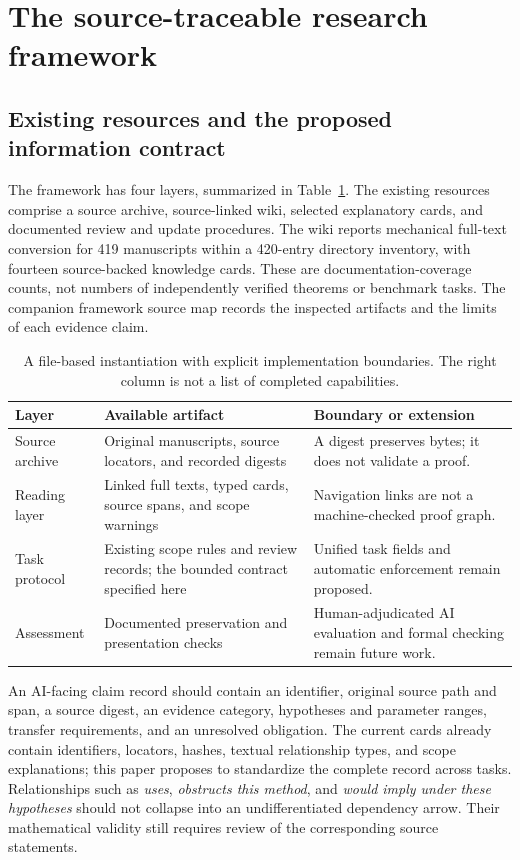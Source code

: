 \section{The source-traceable research framework}\label{sec:framework}
\subsection{Existing resources and the proposed information contract}
The framework has four layers, summarized in Table~\ref{tab:framework}. The existing resources comprise a source archive, source-linked wiki, selected explanatory cards, and documented review and update procedures. The wiki reports mechanical full-text conversion for 419 manuscripts within a 420-entry directory inventory, with fourteen source-backed knowledge cards. These are documentation-coverage counts, not numbers of independently verified theorems or benchmark tasks. The companion framework source map records the inspected artifacts and the limits of each evidence claim.

\begin{table}[htbp]
\centering\small
\begin{tabularx}{\linewidth}{@{}>{\raggedright\arraybackslash}p{.18\linewidth}XX@{}}
\toprule
Layer & Available artifact & Boundary or extension\\\midrule
Source archive & Original manuscripts, source locators, and recorded digests & A digest preserves bytes; it does not validate a proof.\\
Reading layer & Linked full texts, typed cards, source spans, and scope warnings & Navigation links are not a machine-checked proof graph.\\
Task protocol & Existing scope rules and review records; the bounded contract specified here & Unified task fields and automatic enforcement remain proposed.\\
Assessment & Documented preservation and presentation checks & Human-adjudicated AI evaluation and formal checking remain future work.\\
\bottomrule
\end{tabularx}
\caption{A file-based instantiation with explicit implementation boundaries. The right column is not a list of completed capabilities.}\label{tab:framework}
\end{table}

An AI-facing claim record should contain an identifier, original source path and span, a source digest, an evidence category, hypotheses and parameter ranges, transfer requirements, and an unresolved obligation. The current cards already contain identifiers, locators, hashes, textual relationship types, and scope explanations; this paper proposes to standardize the complete record across tasks. Relationships such as \emph{uses}, \emph{obstructs this method}, and \emph{would imply under these hypotheses} should not collapse into an undifferentiated dependency arrow. Their mathematical validity still requires review of the corresponding source statements.

